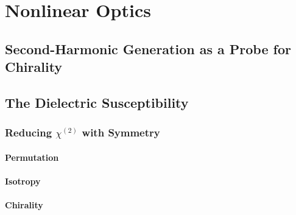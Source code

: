 \chapter{Nonlinear Optics}\label{sec:background:NonlinearOptics}

\section{Second-Harmonic Generation as a Probe for Chirality}\label{sec:background:NonlinearOptics:background}

\section{The Dielectric Susceptibility}\label{sec:background:NonlinearOptics:susceptibility}
\subsection{Reducing \texorpdfstring{$\chi^{(2)}$}{Lg} with Symmetry}\label{sec:background:NonlinearOptics:tensorsymmetry}
\subsubsection{Permutation}\label{sec:background:NonlinearOptics:tensorsymmetry:permutation}
\subsubsection{Isotropy}\label{sec:background:NonlinearOptics:tensorsymmetry:isotropy}
\subsubsection{Chirality}\label{sec:background:NonlinearOptics:tensorsymmetry:chirality}